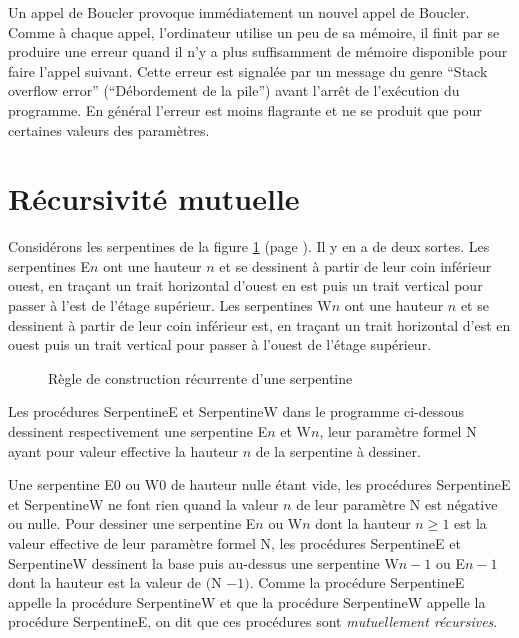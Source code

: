 
Un appel de {\idt Boucler} provoque immédiatement un nouvel appel de {\idt Bou\-cler}. Comme à chaque appel,
l'ordinateur utilise un peu de sa mémoire, il finit par se produire une erreur quand il n'y a plus
suffisamment de mémoire disponible pour faire l'appel suivant. Cette erreur est signalée 
par un message du genre ``Stack overflow error'' (``Débordement de la pile'') avant l'arrêt
de l'exécution du programme. En général 
l'erreur est moins flagrante et ne se produit que pour certaines valeurs des paramètres.

\section{Récursivité mutuelle}
Considérons les serpentines de la figure \ref{fig:serprec} (page \pageref{fig:serprec}). Il y en a
de deux sortes.  Les serpentines 
{\idt E$\scriptscriptstyle n$} ont 
une hauteur $n$ et se dessinent à partir de leur coin inférieur ouest, en traçant un trait 
horizontal d'ouest en est puis un trait vertical pour passer à l'est de l'étage supérieur. 
Les serpentines {\idt W$\scriptscriptstyle n$} ont une hauteur $n$ et se dessinent 
à partir de leur coin inférieur est, en traçant un trait horizontal d'est en ouest puis un trait
vertical pour passer à l'ouest de l'étage supérieur.  
\begin{figure}[htbp]
 \caption{Règle de construction récurrente d'une serpentine}\label{fig:serprec}
\end{figure}

\noindent Les procédures {\idt SerpentineE} et {\idt SerpentineW} dans le programme ci-dessous
dessinent respectivement une serpentine {\idt E$\scriptscriptstyle n$} et 
{\idt W$\scriptscriptstyle n$}, leur paramètre formel {\idt N} ayant pour valeur effective
la hauteur $n$ de la serpentine à dessiner. 

\noindent Une serpentine
{\idt E$\scriptscriptstyle 0$} ou {\idt W$\scriptscriptstyle 0$} de hauteur nulle étant vide, 
les procédures {\idt SerpentineE} et {\idt SerpentineW} ne font rien quand la valeur $n$ de leur 
paramètre {\idt N} est négative ou nulle. 
Pour dessiner une serpentine {\idt E$\scriptscriptstyle n$} ou {\idt W$\scriptscriptstyle n$} dont la 
hauteur $n \geq 1$ est la valeur effective de leur paramètre formel {\idt N}, les procédures 
{\idt SerpentineE} et {\idt SerpentineW} dessinent la 
base puis au-dessus une serpentine {\idt W$\scriptscriptstyle n-1$} 
ou {\idt E$\scriptscriptstyle n-1$} dont  la hauteur est la valeur de $(${\idt N} $- 1)$. Comme
la procédure {\idt SerpentineE} appelle la procédure {\idt SerpentineW} et que la procédure
{\idt SerpentineW} appelle la procédure {\idt SerpentineE}, on dit que ces procédures sont
{\em mutuellement récursives\/}.

